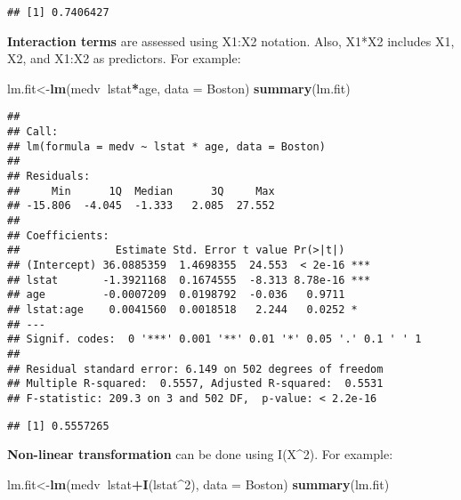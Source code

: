 \documentclass[]{article}
\newenvironment{Shaded}{\begin{snugshade}}{\end{snugshade}}
\newcommand{\KeywordTok}[1]{\textcolor[rgb]{0.13,0.29,0.53}{\textbf{#1}}}
\newcommand{\DataTypeTok}[1]{\textcolor[rgb]{0.13,0.29,0.53}{#1}}
\newcommand{\DecValTok}[1]{\textcolor[rgb]{0.00,0.00,0.81}{#1}}
\newcommand{\OperatorTok}[1]{\textcolor[rgb]{0.81,0.36,0.00}{\textbf{#1}}}
\newcommand{\NormalTok}[1]{#1}
\begin{document}
\begin{verbatim}
## [1] 0.7406427
\end{verbatim}

\textbf{Interaction terms} are assessed using X1:X2 notation. Also,
X1*X2 includes X1, X2, and X1:X2 as predictors. For example:

\begin{Shaded}
\begin{Highlighting}[]
\NormalTok{lm.fit<-}\KeywordTok{lm}\NormalTok{(medv}\OperatorTok{~}\NormalTok{lstat}\OperatorTok{*}\NormalTok{age, }\DataTypeTok{data =}\NormalTok{ Boston)}
\KeywordTok{summary}\NormalTok{(lm.fit)}
\end{Highlighting}
\end{Shaded}

\begin{verbatim}
## 
## Call:
## lm(formula = medv ~ lstat * age, data = Boston)
## 
## Residuals:
##     Min      1Q  Median      3Q     Max 
## -15.806  -4.045  -1.333   2.085  27.552 
## 
## Coefficients:
##               Estimate Std. Error t value Pr(>|t|)    
## (Intercept) 36.0885359  1.4698355  24.553  < 2e-16 ***
## lstat       -1.3921168  0.1674555  -8.313 8.78e-16 ***
## age         -0.0007209  0.0198792  -0.036   0.9711    
## lstat:age    0.0041560  0.0018518   2.244   0.0252 *  
## ---
## Signif. codes:  0 '***' 0.001 '**' 0.01 '*' 0.05 '.' 0.1 ' ' 1
## 
## Residual standard error: 6.149 on 502 degrees of freedom
## Multiple R-squared:  0.5557, Adjusted R-squared:  0.5531 
## F-statistic: 209.3 on 3 and 502 DF,  p-value: < 2.2e-16
\end{verbatim}

\begin{Shaded}
\end{Shaded}

\begin{verbatim}
## [1] 0.5557265
\end{verbatim}

\textbf{Non-linear transformation} can be done using I(X\^{}2). For
example:

\begin{Shaded}
\begin{Highlighting}[]
\NormalTok{lm.fit<-}\KeywordTok{lm}\NormalTok{(medv}\OperatorTok{~}\NormalTok{lstat}\OperatorTok{+}\KeywordTok{I}\NormalTok{(lstat}\OperatorTok{^}\DecValTok{2}\NormalTok{), }\DataTypeTok{data =}\NormalTok{ Boston)}
\KeywordTok{summary}\NormalTok{(lm.fit)}
\end{Highlighting}
\end{Shaded}
\end{document}
